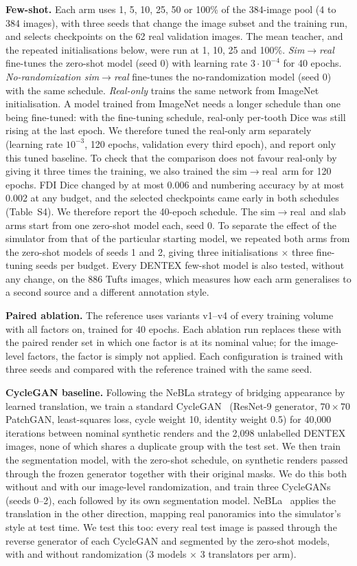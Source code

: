 \documentclass[preprint,12pt]{elsarticle}
\newcommand{\sr}{sim$\to$real}
\newcommand{\Sr}{Sim$\to$real}
\begin{document}
\textbf{Few-shot.} Each arm uses 1, 5, 10, 25, 50 or 100\% of the 384-image pool (4 to 384 images), with three seeds that
change the image subset and the training run, and selects checkpoints on the 62 real validation images. The mean
teacher, and the repeated initialisations below, were run at 1, 10, 25 and 100\%. \emph{\Sr}
fine-tunes the zero-shot model (seed 0) with learning rate $3\cdot10^{-4}$ for 40 epochs. \emph{No-randomization
\sr} fine-tunes the no-randomization model (seed 0) with the same schedule. \emph{Real-only} trains the same network from
ImageNet initialisation. A model trained from ImageNet needs a longer schedule than one being fine-tuned: with the
fine-tuning schedule, real-only per-tooth Dice was still rising at the last epoch. We therefore tuned the real-only arm
separately (learning rate $10^{-3}$, 120 epochs, validation every third epoch), and report only this tuned baseline. To
check that the comparison does not favour real-only by giving it three times the training, we also trained the \sr\ arm
for 120 epochs. FDI Dice changed by at most 0.006 and numbering accuracy by at most 0.002 at any budget, and the selected
checkpoints came early in both schedules (Table~S4). We therefore report the 40-epoch schedule. The \sr\ and slab arms
start from one zero-shot model each, seed 0. To separate the effect of the simulator from that of the particular
starting model, we repeated both arms from the zero-shot models of seeds 1 and 2, giving three initialisations $\times$
three fine-tuning seeds per budget. Every
DENTEX few-shot model is also tested, without any change, on the 886 Tufts images, which measures how each arm
generalises to a second source and a different annotation style.

\textbf{Paired ablation.} The reference uses variants v1--v4 of every training volume with all factors on, trained for
40 epochs. Each ablation run replaces these with the paired render set in which one factor is at its nominal value; for
the image-level factors, the factor is simply not applied. Each configuration is trained with three seeds and compared
with the reference trained with the same seed.

\textbf{CycleGAN baseline.} Following the NeBLa strategy of bridging appearance by learned translation, we train a
standard CycleGAN~\cite{zhu2017} (ResNet-9 generator, $70\times70$ PatchGAN, least-squares loss, cycle weight 10,
identity weight 0.5) for 40,000 iterations between nominal synthetic renders and the 2,098 unlabelled DENTEX images, none
of which shares a duplicate group with the test set. We then train the segmentation model, with the zero-shot schedule,
on synthetic renders passed through the frozen generator together with their original masks. We do this both without
and with our image-level randomization, and train three CycleGANs (seeds 0--2), each followed by its own segmentation
model. NeBLa~\cite{park2024} applies the translation in the other direction, mapping real panoramics into the simulator's
style at test time. We test this too: every real test image is passed through the reverse generator of each CycleGAN
and segmented by the zero-shot models, with and without randomization (3 models $\times$ 3 translators per arm).
\end{document}
